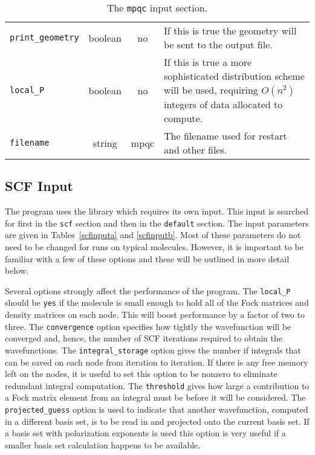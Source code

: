 \begin{table}
\begin{tabular}{|lccp{2.75in}|}
  {\tt print\_geometry}   &boolean& no & If this is true the geometry will
                                         be sent to the output file. \\
  {\tt local\_P}          &boolean& no & If this is true a more sophisticated
                                         distribution scheme will be used,
                                         requiring $O(n^2 )$ integers of
                                         data allocated to compute. \\
  {\tt filename}          &string&mpqc& The filename used for
                                            restart and other files.\\
\hline
\end{tabular}
\caption{The {\tt mpqc} input section.}
\label{mpqcinput}
\end{table}

\subsection{SCF Input}
The \mpqc{} program uses the \libdmtscf{} library which requires its own
input.  This input
is searched for first in the {\tt scf}
section and then in the {\tt default} section.  The input parameters are given
in Tables~\ref{scfinputa} and \ref{scfinputb}.
Most of these parameters do not need to be
changed for runs on typical molecules.  However, it is important to
be familiar with a few of these options and these will be outlined
in more detail below.

Several options strongly affect the performance of the program.
The {\tt local\_P} should be {\tt yes} if the molecule is small
enough to hold all of the Fock matrices and density matrices on each
node.  This will boost performance by a factor of two to three.
The {\tt convergence} option specifies how tightly the wavefunction
will be converged and, hence, the number of SCF iterations
required to obtain the wavefunctions.
The {\tt integral\_storage} option gives the number if integrals
that can be saved on each node from iteration to iteration.  If
there is any free memory left on the nodes, it is useful to set
this option to be nonzero to eliminate redundant integral
computation.
The {\tt threshold} gives how large a contribution to a Fock
matrix element from an integral must be before it will be
considered.  The {\tt projected\_guess} option is used to
indicate that another wavefunction, computed in a different basis set,
is to be read in and projected onto the current basis set.  If
a basis set with polarization exponents is used this option is
very useful if a smaller basis set calculation happens to be
available.

